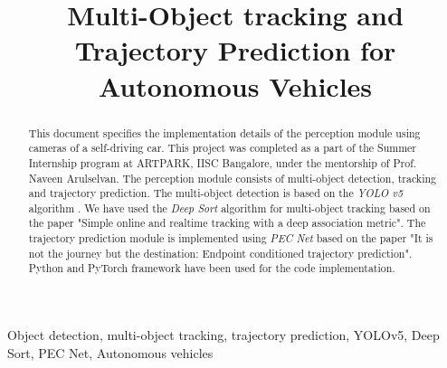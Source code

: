 \documentclass[conference]{IEEEtran}
\begin{document}
\title{Multi-Object tracking and Trajectory Prediction for Autonomous Vehicles\\
}

\author{
  \and
}

\maketitle

\begin{abstract}
  This document specifies the implementation details of the perception module using cameras of a self-driving car. This project was completed as a part of the Summer Internship program at ARTPARK, IISC Bangalore, under the mentorship of Prof. Naveen Arulselvan. The perception module consists of multi-object detection, tracking and trajectory prediction. The multi-object detection is based on the \textit{YOLO v5} algorithm{} \cite{YOLOv5}. We have used the \textit{ Deep Sort} algorithm for multi-object tracking based on the paper "Simple online and realtime tracking with a deep association metric". The trajectory prediction module is implemented using \textit{PEC Net} based on the paper "It is not the journey but the destination: Endpoint conditioned trajectory prediction". Python and PyTorch framework have been used for the code implementation.
\end{abstract}

\begin{IEEEkeywords}
  Object detection, multi-object tracking, trajectory prediction, YOLOv5, Deep Sort, PEC Net, Autonomous vehicles
\end{IEEEkeywords}
\end{document}
